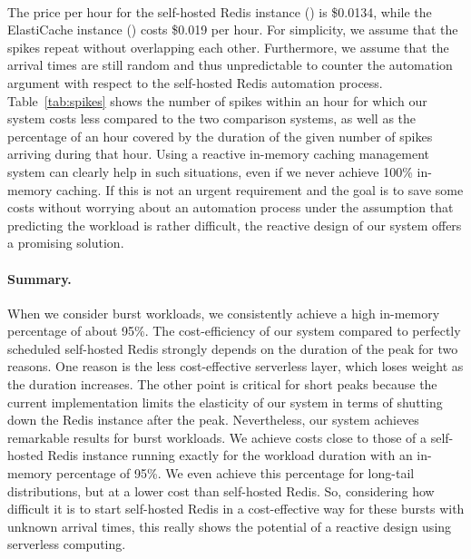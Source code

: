 ~\\
The price per hour for the self-hosted Redis instance () is \$0.0134, while the ElastiCache instance () costs \$0.019 per hour. For simplicity, we assume that the spikes repeat without overlapping each other. Furthermore, we assume that the arrival times are still random and thus unpredictable to counter the automation argument with respect to the self-hosted Redis automation process. Table~\ref{tab:spikes} shows the number of spikes within an hour for which our system costs less compared to the two comparison systems, as well as the percentage of an hour covered by the duration of the given number of spikes arriving during that hour. Using a reactive in-memory caching management system can clearly help in such situations, even if we never achieve 100\% in-memory caching. If this is not an urgent requirement and the goal is to save some costs without worrying about an automation process under the assumption that predicting the workload is rather difficult, the reactive design of our system offers a promising solution.

\paragraph{Summary.}
When we consider burst workloads, we consistently achieve a high in-memory percentage of about 95\%. The cost-efficiency of our system compared to perfectly scheduled self-hosted Redis strongly depends on the duration of the peak for two reasons. One reason is the less cost-effective serverless layer, which loses weight as the duration increases. The other point is critical for short peaks because the current implementation limits the elasticity of our system in terms of shutting down the Redis instance after the peak. Nevertheless, our system achieves remarkable results for burst workloads. We achieve costs close to those of a self-hosted Redis instance running exactly for the workload duration with an in-memory percentage of 95\%. We even achieve this percentage for long-tail distributions, but at a lower cost than self-hosted Redis. So, considering how difficult it is to start self-hosted Redis in a cost-effective way for these bursts with unknown arrival times, this really shows the potential of a reactive design using serverless computing.


